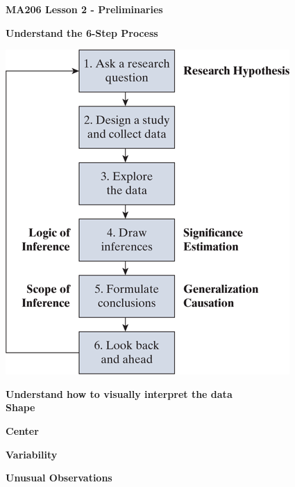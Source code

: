 \documentclass{article}
\newif\ifPrintSolution
\newcommand{\sol}[1]{\ifPrintSolution {\color{blue} #1 } \fi}
\begin{document}
\noindent \textbf{MA206  Lesson 2 - Preliminaries}
\vspace{.1in}

\textbf{Understand the 6-Step Process}

\includegraphics[scale=0.6]{6_Step_Process.png}

\vspace{0.25in}

\textbf{Understand how to visually interpret the data}\\

\hspace{0.1in} \textbf{Shape}

\sol{We want to look if the distribution is symmetric, where it is centered, and how many peaks there are.}
\vfill

\hspace{0.1in} \textbf{Center}

\sol{Where is the distribution centered on? What is a typical value?}
\vfill

\hspace{0.1in} \textbf{Variability}


\sol{How spread out or concentrated is the data? We often report this variation through \textbf{standard deviation}, which can be crudely explained as the average distance of our data from its mean}
\vfill

\hspace{0.1in} \textbf{Unusual Observations}
\end{document}
